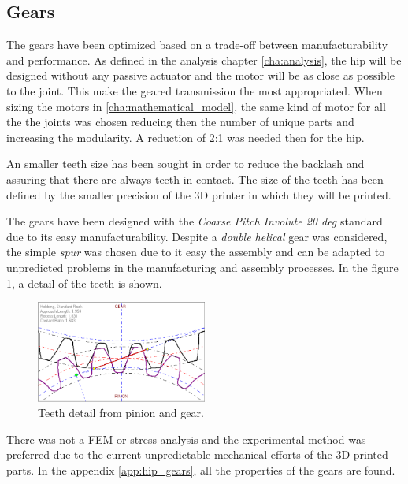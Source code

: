 \subsection{Gears} %
\label{sub:gears}
The gears have been optimized based on a trade-off between manufacturability and performance.
As defined in the analysis chapter \ref{cha:analysis}, the hip will be designed without any passive actuator and the motor will be as close as possible to the joint.
This make the geared transmission the most appropriated.
When sizing the motors in \ref{cha:mathematical_model}, the same kind of motor for all the the joints was chosen reducing then the number of unique parts and increasing the modularity.
A reduction of 2:1 was needed then for the hip.

An smaller teeth size has been sought in order to reduce the backlash and assuring that there are always teeth in contact.
The size of the teeth has been defined by the smaller precision of the 3D printer in which they will be printed.

The gears have been designed with the \textit{Coarse Pitch Involute 20 deg} standard due to its easy manufacturability.
Despite a \textit{double helical} gear was considered, the simple \textit{spur} was chosen due to it easy the assembly and can be adapted to unpredicted problems in the manufacturing and assembly processes. 
In the figure \ref{fig:teeth_detail}, a detail of the teeth is shown.

\begin{figure}[ht!]
  \centering
  \includegraphics[width=0.5\textwidth]{figures/hip_gears}
  \caption{Teeth detail from pinion and gear.}
  \label{fig:teeth_detail}
\end{figure}

There was not a FEM or stress analysis and the experimental method was preferred due to the current unpredictable mechanical efforts of the 3D printed parts. In the appendix \ref{app:hip_gears}, all the properties of the gears are found.

